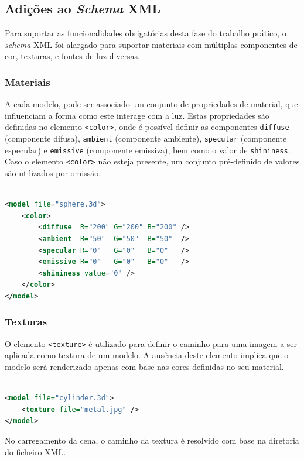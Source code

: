 \documentclass[12pt, a4paper]{article}
\begin{document}
\subsection{Adições ao \emph{Schema} XML}

Para suportar as funcionalidades obrigatórias desta fase do trabalho prático, o \emph{schema} XML
foi alargado para suportar materiais com múltiplas componentes de cor, texturas, e fontes de luz
diversas.

\subsubsection{Materiais}

A cada modelo, pode ser associado um conjunto de propriedades de material, que influenciam a forma
como este interage com a luz. Estas propriedades são definidas no elemento \texttt{<color>}, onde é
possível definir as componentes \texttt{diffuse} (componente difusa), \texttt{ambient} (componente
ambiente), \texttt{specular} (componente especular) e \texttt{emissive} (componente emissiva), bem
como o valor de \texttt{shininess}. Caso o elemento \texttt{<color>} não esteja presente, um
conjunto pré-definido de valores são utilizados por omissão.

\begin{lstlisting}[language=xml]

<model file="sphere.3d">
    <color>
        <diffuse  R="200" G="200" B="200" />
        <ambient  R="50"  G="50"  B="50"  />
        <specular R="0"   G="0"   B="0"   />
        <emissive R="0"   G="0"   B="0"   />
        <shininess value="0" />
    </color>
</model>
\end{lstlisting}

\subsubsection{Texturas}

O elemento \texttt{<texture>} é utilizado para definir o caminho para uma imagem a ser aplicada como
textura de um modelo. A ausência deste elemento implica que o modelo será renderizado apenas com
base nas cores definidas no seu material.

\begin{lstlisting}[language=xml]

<model file="cylinder.3d">
    <texture file="metal.jpg" />
</model>
\end{lstlisting}

No carregamento da cena, o caminho da textura é resolvido com base na diretoria do ficheiro XML.
\end{document}
